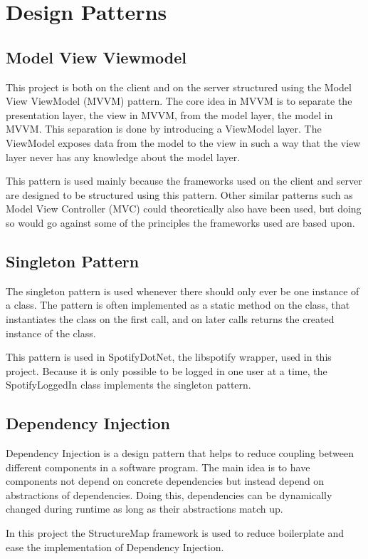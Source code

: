 \chapter{Design Patterns}

\section{Model View Viewmodel}

This project is both on the client and on the server structured using
the Model View ViewModel (MVVM) pattern. The core idea in MVVM is to
separate the presentation layer, the view in MVVM, from the model
layer, the model in MVVM. This separation is done by introducing a
ViewModel layer. The ViewModel exposes data from the model to the view
in such a way that the view layer never has any knowledge about the
model layer.

This pattern is used mainly because the frameworks used on the client
and server are designed to be structured using this pattern. Other
similar patterns such as Model View Controller (MVC) could
theoretically also have been used, but doing so would go against some
of the principles the frameworks used are based upon.

\section{Singleton Pattern}

The singleton pattern is used whenever there should only ever be one
instance of a class. The pattern is often implemented as a static
method on the class, that instantiates the class on the first call,
and on later calls returns the created instance of the class.

This pattern is used in SpotifyDotNet, the libspotify wrapper, used in
this project. Because it is only possible to be logged in one user at
a time, the SpotifyLoggedIn class implements the singleton pattern.

\section{Dependency Injection}

Dependency Injection is a design pattern that helps to reduce coupling
between different components in a software program. The main idea is
to have components not depend on concrete dependencies but instead
depend on abstractions of dependencies. Doing this, dependencies can
be dynamically changed during runtime as long as their abstractions
match up.

In this project the StructureMap framework is used to reduce
boilerplate and ease the implementation of Dependency Injection.
